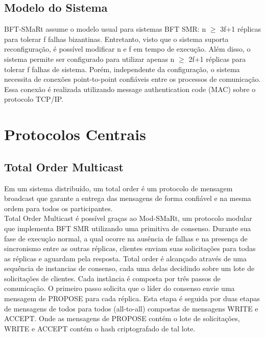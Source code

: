 		\subsection{Modelo do Sistema}
		BFT-SMaRt assume o modelo usual para sistemas BFT SMR: n $\geq$ 3f+1 réplicas para tolerar f falhas bizantinas. Entretanto, visto que o sistema suporta reconfiguração, é possível modificar n e f em tempo de execução. Além disso, o sistema permite ser configurado para utilizar apenas n $\geq$ 2f+1 réplicas para tolerar f falhas de sistema. Porém, independente da configuração, o sistema necessita de conexões point-to-point confiáveis entre os processos de comunicação. Essa conexão é realizada utilizando message authentication code (MAC) sobre o protocolo TCP/IP.\\
	
	\section{Protocolos Centrais}
	
		\subsection{Total Order Multicast}
		Em um sistema distribuído, um total order é um protocolo de mensagem broadcast que garante a entrega das mensagens de forma confiável e na mesma ordem para todos os participantes.\\
		
		Total Order Multicast é possível graças ao Mod-SMaRt, um protocolo modular que implementa BFT SMR utilizando uma primitiva de consenso. Durante sua fase de execução normal, a qual ocorre na ausência de falhas e na presença de sincronismo entre as outras réplicas, clientes enviam suas solicitações para todas as réplicas e aguardam pela resposta. Total order é alcançado através de uma sequência de instancias de consenso, cada uma delas decidindo sobre um lote de solicitações de clientes. Cada instância é composta por três passos de comunicação. O primeiro passo solicita que o líder do consenso envie uma mensagem de PROPOSE para cada réplica. Esta etapa é seguida por duas etapas de mensagens de todos para todos (all-to-all) compostas de mensagens WRITE e ACCEPT. Onde as mensagens de PROPOSE contém o lote de solicitações, WRITE e ACCEPT contém o hash criptografado de tal lote.\\
		
